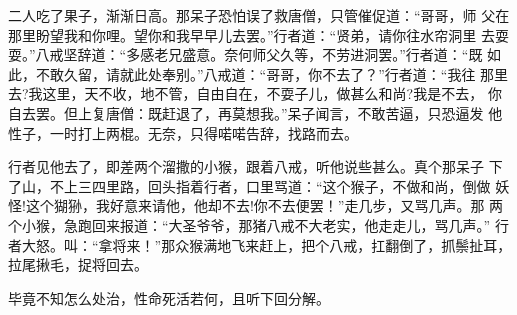 二人吃了果子，渐渐日高。那呆子恐怕误了救唐僧，只管催促道：“哥哥，师
父在那里盼望我和你哩。望你和我早早儿去罢。”行者道：“贤弟，请你往水帘洞里
去耍耍。”八戒坚辞道：“多感老兄盛意。奈何师父久等，不劳进洞罢。”行者道：“既
如此，不敢久留，请就此处奉别。”八戒道：“哥哥，你不去了？”行者道：“我往
那里去?我这里，天不收，地不管，自由自在，不耍子儿，做甚么和尚?我是不去，
你自去罢。但上复唐僧：既赶退了，再莫想我。”呆子闻言，不敢苦逼，只恐逼发
他性子，一时打上两棍。无奈，只得喏喏告辞，找路而去。

行者见他去了，即差两个溜撒的小猴，跟着八戒，听他说些甚么。真个那呆子
下了山，不上三四里路，回头指着行者，口里骂道：“这个猴子，不做和尚，倒做
妖怪!这个猢狲，我好意来请他，他却不去!你不去便罢！”走几步，又骂几声。那
两个小猴，急跑回来报道：“大圣爷爷，那猪八戒不大老实，他走走儿，骂几声。”
行者大怒。叫：“拿将来！”那众猴满地飞来赶上，把个八戒，扛翻倒了，抓鬃扯耳，
拉尾揪毛，捉将回去。

毕竟不知怎么处治，性命死活若何，且听下回分解。